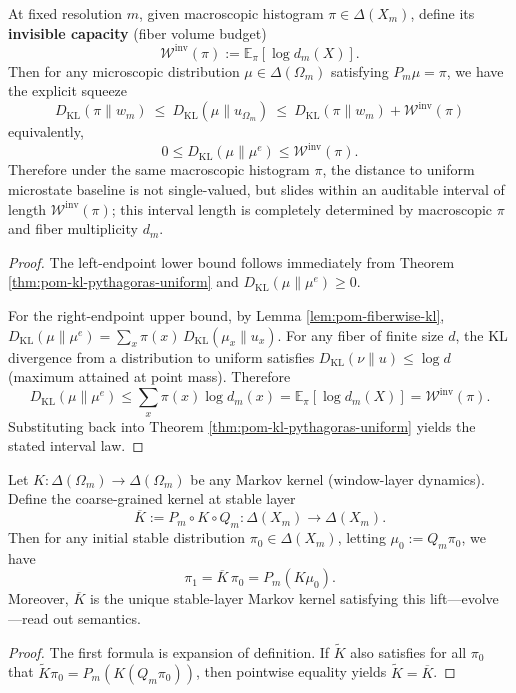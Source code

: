 \begin{corollary}\label{cor:pom-micro-slip-window}
At fixed resolution $m$, given macroscopic histogram $\pi\in\Delta(X_m)$, define its \textbf{invisible capacity} (fiber volume budget)
\[
\mathcal{W}^{\mathrm{inv}}(\pi):=\mathbb{E}_\pi[\log d_m(X)].
\]
Then for any microscopic distribution $\mu\in\Delta(\Omega_m)$ satisfying $P_m\mu=\pi$, we have the explicit squeeze
\[
\boxed{\;
D_{\mathrm{KL}}(\pi\|w_m)\ \le\ D_{\mathrm{KL}}(\mu\|u_{\Omega_m})\ \le\ D_{\mathrm{KL}}(\pi\|w_m)+\mathcal{W}^{\mathrm{inv}}(\pi)
\;}
\]
equivalently,
\[
0\le D_{\mathrm{KL}}(\mu\|\mu^e)\le \mathcal{W}^{\mathrm{inv}}(\pi).
\]
Therefore under the same macroscopic histogram $\pi$, the distance to uniform microstate baseline is not single-valued, but slides within an auditable interval of length $\mathcal{W}^{\mathrm{inv}}(\pi)$; this interval length is completely determined by macroscopic $\pi$ and fiber multiplicity $d_m$.
\end{corollary}
\begin{proof}
The left-endpoint lower bound follows immediately from Theorem \ref{thm:pom-kl-pythagoras-uniform} and $D_{\mathrm{KL}}(\mu\|\mu^e)\ge 0$.
\par
For the right-endpoint upper bound, by Lemma \ref{lem:pom-fiberwise-kl},
\(
D_{\mathrm{KL}}(\mu\|\mu^e)=\sum_x \pi(x)\,D_{\mathrm{KL}}(\mu_x\|u_x)
\).
For any fiber of finite size $d$, the KL divergence from a distribution to uniform satisfies
\(
D_{\mathrm{KL}}(\nu\|u)\le \log d
\)
(maximum attained at point mass).
Therefore
\[
D_{\mathrm{KL}}(\mu\|\mu^e)\le \sum_x \pi(x)\log d_m(x)=\mathbb{E}_\pi[\log d_m(X)]=\mathcal{W}^{\mathrm{inv}}(\pi).
\]
Substituting back into Theorem \ref{thm:pom-kl-pythagoras-uniform} yields the stated interval law.
\end{proof}

\begin{theorem}\label{thm:pom-coarse-grained-kernel}
Let $K:\Delta(\Omega_m)\to\Delta(\Omega_m)$ be any Markov kernel (window-layer dynamics).
Define the coarse-grained kernel at stable layer
\[
\overline K:=P_m\circ K\circ Q_m:\Delta(X_m)\to\Delta(X_m).
\]
Then for any initial stable distribution $\pi_0\in\Delta(X_m)$, letting $\mu_0:=Q_m\pi_0$, we have
\[
\pi_1=\overline K\,\pi_0=P_m(K\mu_0).
\]
Moreover, $\overline K$ is the unique stable-layer Markov kernel satisfying this lift—evolve—read out semantics.
\end{theorem}
\begin{proof}
The first formula is expansion of definition. If $\widetilde K$ also satisfies for all $\pi_0$ that
\(
\widetilde K\pi_0=P_m(K(Q_m\pi_0))
\),
then pointwise equality yields $\widetilde K=\overline K$.
\end{proof}

